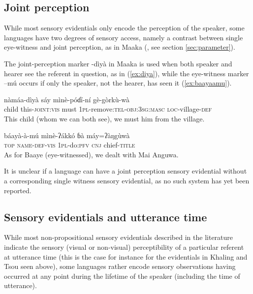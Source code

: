 \documentclass[oneside,a4paper,11pt]{article}
\newcommand{\ipa}[1]{{\phon \mbox{#1}}} %
\begin{document}
  

\subsection{Joint perception} \label{sec:joint}
While most sensory evidentials only encode the perception of the speaker, some languages have two degrees of sensory access, namely a contrast between single eye-witness and joint perception, as in Maaka (\citealt[195-7]{storch14maaka}, see section \ref{sec:parameter}).

 The joint-perception marker \ipa{-dìyà} in Maaka is used when both speaker and hearer see the referent in question, as in (\ref{ex:diya}), while the eye-witness marker \ipa{--mú} occurs if only the speaker, not the hearer, has seen it (\ref{ex:baayaamu}).
 
 \begin{exe}
\ex \label{ex:diya}
\gll \ipa{làa} 	\ipa{nàmáa-dìyà} 	\ipa{sáy} 	\ipa{mìnè-póɗí-ní} 	\ipa{gè-gòrkù-wà}  \\
child this-\textsc{joint:vis} must \textsc{1pl}-remove:\textsc{tel-obj:3sg:masc} \textsc{loc}-village-\textsc{def} \\
\glt This child (whom we can both see), we must him from the village.
\end{exe}

 \begin{exe}
\ex \label{ex:baayaamu}
\gll \ipa{tò} 	\ipa{báayà-à-mú} 	\ipa{mìnè-ʔákkó} 	\ipa{ɓà} 	\ipa{máy=ʔàŋgùwà}  \\
\textsc{top} \textsc{name-def-vis} \textsc{1pl}-do:\textsc{pfv} \textsc{cnj} chief-\textsc{title} \\
\glt As for Baaye (eye-witnessed), we dealt with Mai Anguwa.
\end{exe}

It is unclear if a language can have a joint perception sensory evidential without a corresponding single witness sensory evidential, as no such system has yet been reported.

\subsection{Sensory evidentials and utterance time} \label{sec:UT}
While most non-propositional sensory evidentials described in the literature indicate the sensory (visual or non-visual) perceptibility of a particular referent at utterance time (this is the case for instance for the evidentials in Khaling  and Tsou seen above), some languages rather encode sensory observations having occurred at any point during the lifetime of the speaker (including the time of utterance). 
\end{document}
